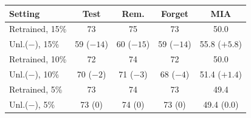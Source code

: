 {\footnotesize\setlength{\tabcolsep}{3pt}
\begin{tabular}{@{}lcccc@{}}
\toprule
Setting & Test & Rem. & Forget & MIA \\
\midrule
Retrained, 15\% & 73 & 75 & 73 & 50.0 \\
Unl.($-$), 15\% & 59 ($-14$) & 60 ($-15$) & 59 ($-14$) & 55.8 ($+5.8$) \\
Retrained, 10\% & 72 & 74 & 72 & 50.0 \\
Unl.($-$), 10\% & 70 ($-2$) & 71 ($-3$) & 68 ($-4$) & 51.4 ($+1.4$) \\
Retrained, 5\% & 73 & 74 & 73 & 49.4 \\
Unl.($-$), 5\% & 73 (0) & 74 (0) & 73 (0) & 49.4 (0.0) \\
\bottomrule
\end{tabular}}
